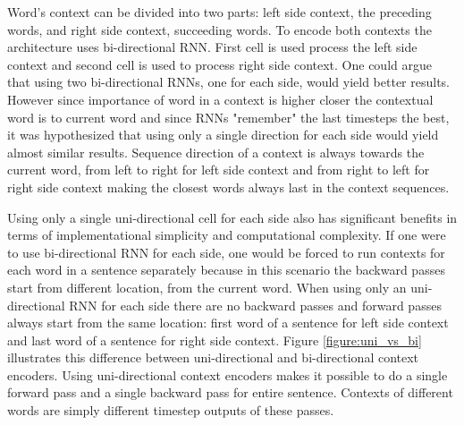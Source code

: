 \documentclass[12pt,a4paper,english
]{tutthesis}
\begin{document}
Word's context can be divided into two parts: left side context, the preceding words, and right side context, succeeding words. To encode both contexts the architecture uses bi-directional RNN. First cell is used process the left side context and second cell is used to process right side context. One could argue that using two bi-directional RNNs, one for each side, would yield better results. However since importance of word in a context is higher closer the contextual word is to current word and since RNNs "remember" the last timesteps the best, it was hypothesized that using only a single direction for each side would yield almost similar results. Sequence direction of a context is always towards the current word, from left to right for left side context and from right to left for right side context making the closest words always last in the context sequences.

Using only a single uni-directional cell for each side also has significant benefits in terms of implementational simplicity and computational complexity. If one were to use bi-directional RNN for each side, one would be forced to run contexts for each word in a sentence separately because in this scenario the backward passes start from different location, from the current word. When using only an uni-directional RNN for each side there are no backward passes and forward passes always start from the same location: first word of a sentence for left side context and last word of a sentence for right side context. Figure \ref{figure:uni_vs_bi} illustrates this difference between uni-directional and bi-directional context encoders. Using uni-directional context encoders makes it possible to do a single forward pass and a single backward pass for entire sentence. Contexts of different words are simply different timestep outputs of these passes.
\end{document}
